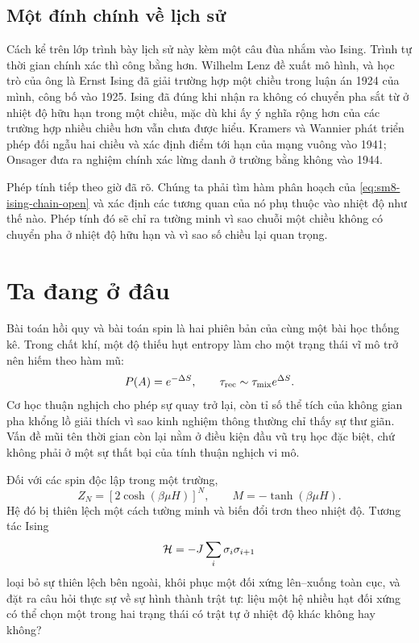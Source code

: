 \subsection{Một đính chính về lịch sử}

Cách kể trên lớp trình bày lịch sử này kèm một câu đùa nhắm vào Ising.
Trình tự thời gian chính xác thì công bằng hơn. Wilhelm Lenz đề xuất mô hình, và học trò của ông
là Ernst Ising đã giải trường hợp một chiều trong luận án 1924 của mình,
công bố vào 1925. Ising đã đúng khi nhận ra không có chuyển pha
sắt từ ở nhiệt độ hữu hạn trong một chiều, mặc dù khi ấy ý nghĩa rộng hơn của các trường hợp nhiều chiều hơn vẫn chưa được hiểu. Kramers và Wannier phát triển
phép đối ngẫu hai chiều và xác định điểm tới hạn của mạng vuông vào
1941; Onsager đưa ra nghiệm chính xác lừng danh ở trường bằng không vào 1944.

Phép tính tiếp theo giờ đã rõ. Chúng ta phải tìm hàm phân hoạch của
\eqref{eq:sm8-ising-chain-open} và xác định các tương quan của nó phụ thuộc vào
nhiệt độ như thế nào. Phép tính đó sẽ chỉ ra tường minh vì sao chuỗi một chiều không có chuyển pha ở nhiệt độ hữu hạn và vì sao số chiều lại quan trọng.

\section{Ta đang ở đâu}

Bài toán hồi quy và bài toán spin là hai phiên bản của cùng một
bài học thống kê. Trong chất khí, một độ thiếu hụt entropy làm cho một trạng thái vĩ mô
trở nên hiếm theo hàm mũ:
\begin{equation}
 P(A)=e^{-\Delta S},
 \qquad
 \tau_{\rm rec}\sim\tau_{\rm mix}e^{\Delta S}.
 \label{eq:sm8-summary-recurrence}
\end{equation}
Cơ học thuận nghịch cho phép sự quay trở lại, còn tỉ số thể tích của không gian pha
khổng lồ giải thích vì sao kinh nghiệm thông thường chỉ thấy sự thư giãn. Vấn đề
mũi tên thời gian còn lại nằm ở điều kiện đầu vũ trụ học đặc biệt, chứ không
phải ở một sự thất bại của tính thuận nghịch vi mô.

Đối với các spin độc lập trong một trường,
\begin{equation}
 Z_N=\left[2\cosh(\beta\mu H)\right]^N,
 \qquad
 M=-\tanh(\beta\mu H).
 \label{eq:sm8-summary-spins}
\end{equation}
Hệ đó bị thiên lệch một cách tường minh và biến đổi trơn theo nhiệt độ. Tương tác Ising
\begin{equation}
 {\cal H}=-J\sum_i\sigma_i\sigma_{i+1}
 \label{eq:sm8-summary-ising}
\end{equation}
loại bỏ sự thiên lệch bên ngoài, khôi phục một đối xứng lên--xuống toàn cục, và đặt ra
câu hỏi thực sự về sự hình thành trật tự: liệu một hệ nhiều hạt đối xứng có thể chọn một trong
hai trạng thái có trật tự ở nhiệt độ khác không hay không?